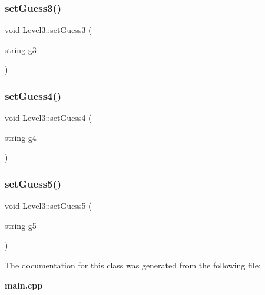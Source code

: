 \mbox{\label{class_level3_a8245dd4ac6d48e3cdfcd245c2569723d}} 
\subsubsection{setGuess3()}
{\footnotesize\ttfamily void Level3\+::set\+Guess3 (\begin{DoxyParamCaption}\item[{string}]{g3 }\end{DoxyParamCaption})\hspace{0.3cm}{\ttfamily [inline]}}

\mbox{\label{class_level3_a2f70bf745051deba392224a79d5bcd6c}} 
\subsubsection{setGuess4()}
{\footnotesize\ttfamily void Level3\+::set\+Guess4 (\begin{DoxyParamCaption}\item[{string}]{g4 }\end{DoxyParamCaption})\hspace{0.3cm}{\ttfamily [inline]}}

\mbox{\label{class_level3_a36d92248d81110cbe8e18c3d25f3952c}} 
\subsubsection{setGuess5()}
{\footnotesize\ttfamily void Level3\+::set\+Guess5 (\begin{DoxyParamCaption}\item[{string}]{g5 }\end{DoxyParamCaption})\hspace{0.3cm}{\ttfamily [inline]}}



The documentation for this class was generated from the following file\+:\begin{DoxyCompactItemize}
\item 
\textbf{ main.\+cpp}\end{DoxyCompactItemize}

